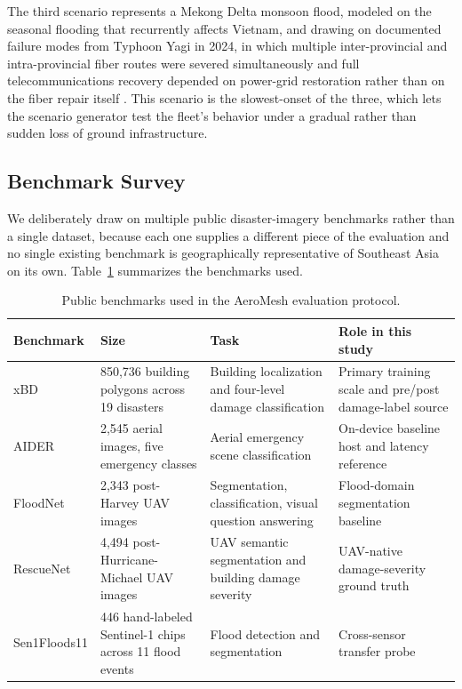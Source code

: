 \documentclass[drones,article,submit,moreauthors]{Definitions/mdpi}
\begin{document}
The third scenario represents a Mekong Delta monsoon flood, modeled on the seasonal flooding that recurrently affects Vietnam, and drawing on documented failure modes from Typhoon Yagi in 2024, in which multiple inter-provincial and intra-provincial fiber routes were severed simultaneously and full telecommunications recovery depended on power-grid restoration rather than on the fiber repair itself \cite{yagi_vietnam_2024}. This scenario is the slowest-onset of the three, which lets the scenario generator test the fleet's behavior under a gradual rather than sudden loss of ground infrastructure.

\subsection{Benchmark Survey}

We deliberately draw on multiple public disaster-imagery benchmarks rather than a single dataset, because each one supplies a different piece of the evaluation and no single existing benchmark is geographically representative of Southeast Asia on its own. Table~\ref{tab:benchmarks} summarizes the benchmarks used.

\begin{table}[H]
\caption{Public benchmarks used in the AeroMesh evaluation protocol.}
\label{tab:benchmarks}
\begin{tabular}{p{2.3cm}p{3.2cm}p{3.6cm}p{3.6cm}}
\toprule
\textbf{Benchmark} & \textbf{Size} & \textbf{Task} & \textbf{Role in this study} \\
\midrule
xBD \cite{gupta2019xbd} & 850{,}736 building polygons across 19 disasters & Building localization and four-level damage classification & Primary training scale and pre/post damage-label source \\
AIDER \cite{kyrkou2020emergencynet} & 2{,}545 aerial images, five emergency classes & Aerial emergency scene classification & On-device baseline host and latency reference \\
FloodNet \cite{rahnemoonfar2021floodnet} & 2{,}343 post-Harvey UAV images & Segmentation, classification, visual question answering & Flood-domain segmentation baseline \\
RescueNet \cite{rahnemoonfar2023rescuenet} & 4{,}494 post-Hurricane-Michael UAV images & UAV semantic segmentation and building damage severity & UAV-native damage-severity ground truth \\
Sen1Floods11 \cite{bonafilia2020sen1floods11} & 446 hand-labeled Sentinel-1 chips across 11 flood events & Flood detection and segmentation & Cross-sensor transfer probe \\
\bottomrule
\end{tabular}
\end{table}
\end{document}
